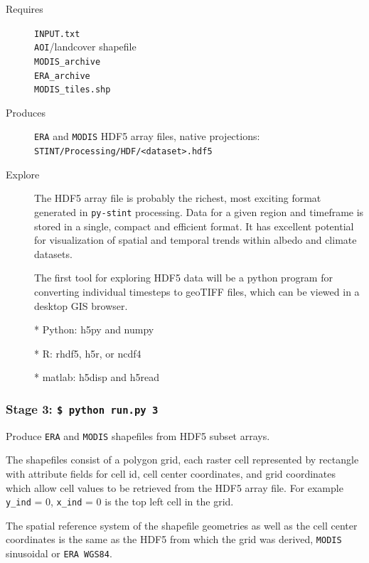 \documentclass[twoside,a4paper]{refart}
\begin{document}
  \begin{description}
    \item [Requires]
          \texttt{INPUT.txt} \\
          \texttt{AOI}/landcover shapefile \\
          \texttt{MODIS\_archive} \\
          \texttt{ERA\_archive} \\
          \texttt{MODIS\_tiles.shp}
  
  
    \item [Produces]
      \texttt{ERA} and \texttt{MODIS} HDF5 array files, native projections:\\
      \texttt{STINT/Processing/HDF/<dataset>.hdf5}
      

    \item [Explore]
      The HDF5 array file is probably the richest, most exciting format 
      generated in \texttt{py-stint} processing. Data for a given region 
      and timeframe is stored in a single, compact and efficient format. 
      It has excellent potential for visualization of spatial and temporal 
      trends within albedo and climate datasets. 
      
      The first tool for exploring HDF5 data will be a python program for
       converting individual timesteps to geoTIFF files, which can be 
       viewed in a desktop GIS browser.
      
      
      * Python: h5py and numpy
      
      * R: rhdf5, h5r, or ncdf4 
      
      * matlab: h5disp and h5read
  \end{description}


\subsubsection{\textbf{Stage 3:} \texttt{\$ python run.py 3}}
Produce \texttt{ERA} and \texttt{MODIS} shapefiles from HDF5 subset arrays.
 
The shapefiles consist of a polygon grid, each raster cell represented by
rectangle with attribute fields for cell id, cell center coordinates, and grid coordinates which allow cell values to be retrieved from the HDF5 array file.  For example  \texttt{y\_ind} = 0, \texttt{x\_ind} = 0 is the top left cell in the grid.
 
The spatial reference system of the shapefile geometries as well as the cell center coordinates is the same as the HDF5 from which the grid was derived, \texttt{MODIS} sinusoidal or \texttt{ERA WGS84}.
\end{document}

